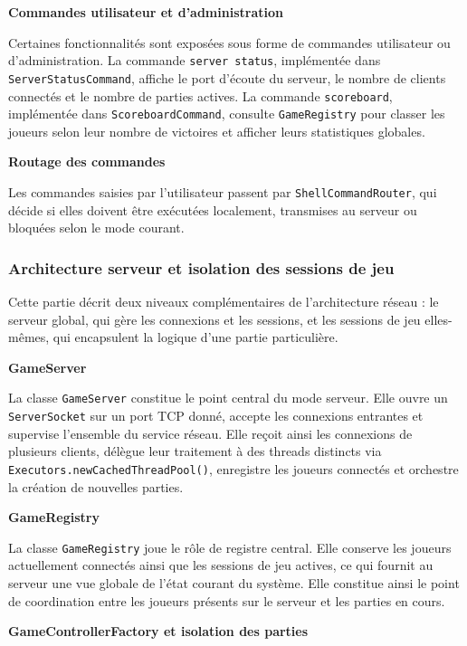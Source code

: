 \documentclass[a4paper]{article}
\begin{document}
\medskip
\noindent\textbf{Commandes utilisateur et d'administration}

Certaines fonctionnalités sont exposées sous forme de commandes utilisateur ou
d'administration. La commande \texttt{server status}, implémentée dans
\texttt{ServerStatusCommand}, affiche le port d'écoute du serveur, le nombre de
clients connectés et le nombre de parties actives. La commande
\texttt{scoreboard}, implémentée dans \texttt{ScoreboardCommand}, consulte
\texttt{GameRegistry} pour classer les joueurs selon leur nombre de victoires
et afficher leurs statistiques globales.

\medskip
\noindent\textbf{Routage des commandes}

Les commandes saisies par l'utilisateur passent par
\texttt{ShellCommandRouter}, qui décide si elles doivent être exécutées
localement, transmises au serveur ou bloquées selon le mode courant.

\subsubsection{Architecture serveur et isolation des sessions de jeu}
\label{sec:archi-serveur-detail}

Cette partie décrit deux niveaux complémentaires de l'architecture réseau :
le serveur global, qui gère les connexions et les sessions, et les sessions de
jeu elles-mêmes, qui encapsulent la logique d'une partie particulière.

\medskip
\noindent\textbf{GameServer}

La classe \texttt{GameServer} constitue le point central du mode serveur. Elle
ouvre un \texttt{ServerSocket} sur un port TCP donné, accepte les connexions
entrantes et supervise l'ensemble du service réseau. Elle reçoit ainsi les
connexions de plusieurs clients, délègue leur traitement à des threads distincts
via \texttt{Executors.newCachedThreadPool()}, enregistre les joueurs connectés
et orchestre la création de nouvelles parties.

\medskip
\noindent\textbf{GameRegistry}

La classe \texttt{GameRegistry} joue le rôle de registre central. Elle conserve
les joueurs actuellement connectés ainsi que les sessions de jeu actives, ce qui
fournit au serveur une vue globale de l'état courant du système. Elle constitue
ainsi le point de coordination entre les joueurs présents sur le serveur et les
parties en cours.

\medskip
\noindent\textbf{GameControllerFactory et isolation des parties}
\end{document}
